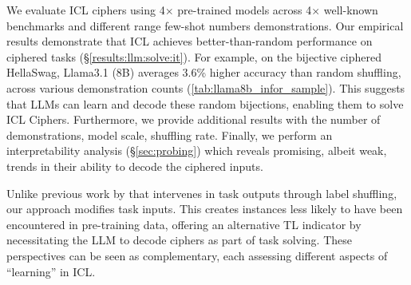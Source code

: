 \documentclass[11pt]{article}
\newcommand{\daniel}[1]{{\color{purple}[{\bf DK}: #1]}}
\begin{document}
We evaluate ICL ciphers using 4$\times$ pre-trained models across 4$\times$ well-known benchmarks and  different range few-shot numbers demonstrations. Our empirical results demonstrate that ICL achieves better-than-random performance on ciphered tasks (\S\ref{results:llm:solve:it}).
For example, on the bijective ciphered HellaSwag, Llama3.1 (8B) averages 3.6\% higher accuracy than random shuffling, across various  demonstration counts (\autoref{tab:llama8b_infor_sample}).
This suggests that LLMs can learn and decode these random bijections, enabling them to solve ICL Ciphers. Furthermore, we provide additional results
with the number of demonstrations, model scale, shuffling rate. Finally, we perform an interpretability analysis (\S\ref{sec:probing})  which reveals promising, albeit weak, trends in their ability to decode the ciphered inputs.






Unlike previous work by \cite{pan2023incontext,wang2024investigating} that intervenes in task outputs through label shuffling, our approach modifies task inputs. This creates instances less likely to have been encountered in pre-training data, offering an alternative TL indicator by necessitating the LLM to decode ciphers as part of task solving. These perspectives can be seen as complementary, each assessing different aspects of ``learning'' in ICL.


\end{document}
